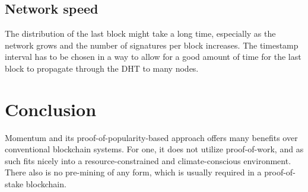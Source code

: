 \documentclass[conference]{IEEEtran}
\begin{document}
\subsection{Network speed}
The distribution of the last block might take a long time, especially as the network
grows and the number of signatures per block increases. The timestamp interval has to be chosen in a way
to allow for a good amount of time for the last block to propagate through the DHT to many nodes.

\section{Conclusion}
Momentum and its proof-of-popularity-based approach offers many benefits over conventional blockchain systems.
For one, it does not utilize proof-of-work,
and as such fits nicely into a resource-constrained and climate-conscious environment. There also is no pre-mining of
any form, which is usually required in a proof-of-stake blockchain.
\end{document}
